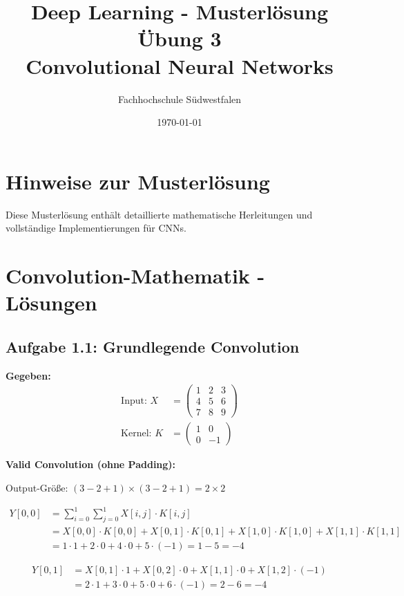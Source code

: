 ﻿\documentclass[12pt,a4paper]{article}
\title{\textbf{Deep Learning - Musterlösung Übung 3} \\ \large Convolutional Neural Networks}
\author{Fachhochschule Südwestfalen}
\date{\today}
\begin{document}
\maketitle

\section*{Hinweise zur Musterlösung}
Diese Musterlösung enthält detaillierte mathematische Herleitungen und vollständige Implementierungen für CNNs.

\section{Convolution-Mathematik - Lösungen}

\subsection{Aufgabe 1.1: Grundlegende Convolution}

\textbf{Gegeben:}
\begin{align}
\text{Input: } X &= \begin{pmatrix} 1 & 2 & 3 \\ 4 & 5 & 6 \\ 7 & 8 & 9 \end{pmatrix} \\
\text{Kernel: } K &= \begin{pmatrix} 1 & 0 \\ 0 & -1 \end{pmatrix}
\end{align}

\textbf{Valid Convolution (ohne Padding):}

Output-Größe: $(3-2+1) \times (3-2+1) = 2 \times 2$

\begin{align}
Y[0,0] &= \sum_{i=0}^{1} \sum_{j=0}^{1} X[i,j] \cdot K[i,j] \\
&= X[0,0] \cdot K[0,0] + X[0,1] \cdot K[0,1] + X[1,0] \cdot K[1,0] + X[1,1] \cdot K[1,1] \\
&= 1 \cdot 1 + 2 \cdot 0 + 4 \cdot 0 + 5 \cdot (-1) = 1 - 5 = -4
\end{align}

\begin{align}
Y[0,1] &= X[0,1] \cdot 1 + X[0,2] \cdot 0 + X[1,1] \cdot 0 + X[1,2] \cdot (-1) \\
&= 2 \cdot 1 + 3 \cdot 0 + 5 \cdot 0 + 6 \cdot (-1) = 2 - 6 = -4
\end{align}
\end{document}
